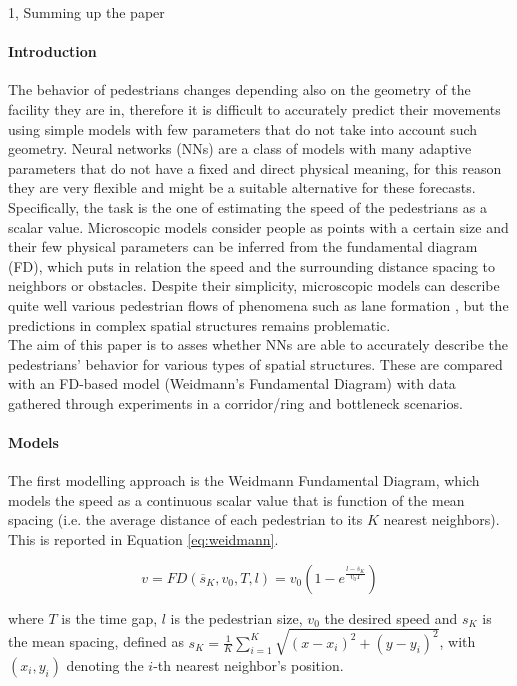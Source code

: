 \documentclass[10pt,a4paper]{article}
\begin{document}
\frontpage

\begin{task}{1, Summing up the paper} \label{sec:intro}
\paragraph{Introduction}
The behavior of pedestrians changes depending also on the geometry of the facility they are in, therefore it is difficult to accurately predict their movements using simple models with few parameters that do not take into account such geometry.
Neural networks (NNs) are a class of models with many adaptive parameters that do not have a fixed and direct physical meaning, for this reason they are very flexible and might be a suitable alternative for these forecasts.
Specifically, the task is the one of estimating the speed of the pedestrians as a scalar value.
Microscopic models consider people as points with a certain size and their few physical parameters can be inferred from the fundamental diagram (FD), which puts in relation the speed and the surrounding distance spacing to neighbors or obstacles.
Despite their simplicity, microscopic models can describe quite well various pedestrian flows of phenomena such as lane formation \cite{tordeux2018, helbing2005, schadschneider2009}, but the predictions in complex spatial structures remains problematic.\\
The aim of this paper is to asses whether NNs are able to accurately describe the pedestrians' behavior for various types of spatial structures.
These are compared with an FD-based model (Weidmann's Fundamental Diagram) with data gathered through experiments in a corridor/ring and bottleneck scenarios.

\paragraph{Models}
The first modelling approach is the Weidmann Fundamental Diagram, which models the speed as a continuous scalar value that is function of the mean spacing (i.e. the average distance of each pedestrian to its $K$ nearest neighbors). This is reported in Equation \ref{eq:weidmann}.

\begin{equation}\label{eq:weidmann}
    v = FD(\overline{s}_K, v_0, T, l) = v_0 \left(1 - e^{\frac{l - \overline{s}_K}{v_0 T}}\right)
\end{equation}

where $T$ is the time gap, $l$ is the pedestrian size, $v_0$ the desired speed and $s_K$ is the mean spacing, defined as $s_K = \frac{1}{K}\sum_{i=1}^K \sqrt{(x - x_i)^2 + (y - y_i)^2}$, with $(x_i,y_i)$ denoting the $i$-th nearest neighbor's position.\\


\end{task}
\end{document}
